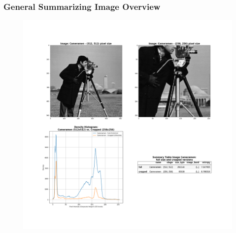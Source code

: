 \begin{frame}
\frametitle{General Summarizing Image Overview}
\begin{figure}
\includegraphics[scale=0.15]{slides/experiments/target-image/complex_3.png}
\end{figure}
\end{frame}
